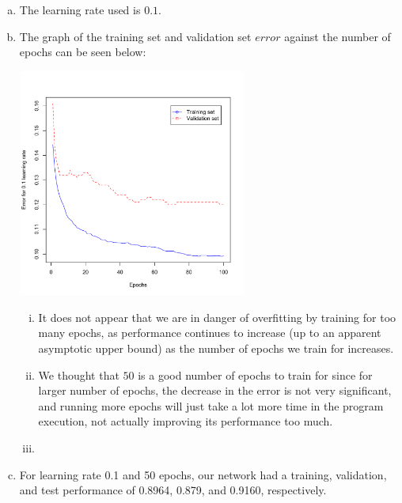 \documentclass{article}
\begin{document}
\begin{enumerate}
\begin{enumerate}[(a)]

\item %
The learning rate used is $0.1$.
 
\item %
The graph of the training set and validation set $error$ against the number of epochs can be seen below:
\begin{center}
\includegraphics[width=75mm]{fig5.pdf}
\end{center}

\begin{enumerate}[i.]

\item %
It does not appear that we are in danger of overfitting by training for too many epochs, as performance continues to increase (up to an apparent asymptotic upper bound) as the number of epochs we train for increases.

\item %
We thought that $50$ is a good number of epochs to train for since for larger number of epochs, the decrease in the error is not very significant, and running more epochs will just take a lot more time in the program execution, not actually improving its performance too much. 

\item %

\end{enumerate}

\item %
For learning rate 0.1 and 50 epochs, our network had a training, validation, and test performance of 0.8964, 0.879, and 0.9160, respectively.

\end{enumerate}


\end{enumerate}
\end{document}
